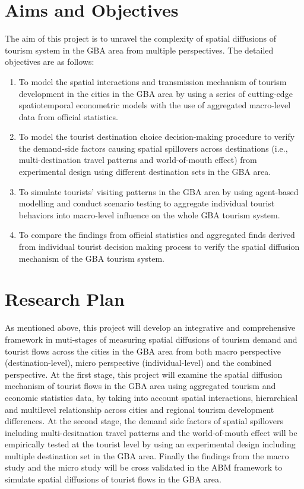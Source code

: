 \documentclass[11pt,a4paper]{amsart}
\theoremstyle{plain}
\theoremstyle{definition}
\begin{document}
\section{Aims and Objectives}
The aim of this project is to unravel the complexity of spatial diffusions of tourism system in the GBA area from multiple perspectives. The detailed objectives are as follows:
\begin{enumerate}
	\item To model the spatial interactions and transmission mechanism of tourism development in the cities in the GBA area by using a series of cutting-edge spatiotemporal econometric models with the use of aggregated macro-level data from official statistics.
	\item To model the tourist destination choice decision-making procedure to verify the demand-side factors causing spatial spillovers across destinations (i.e., multi-destination travel patterns and world-of-mouth effect) from experimental design using different destination sets in the GBA area. 
	\item To simulate tourists’ visiting patterns in the GBA area by using agent-based modelling and conduct scenario testing to aggregate individual tourist behaviors into macro-level influence on the whole GBA tourism system.
	\item To compare the findings from official statistics and aggregated finds derived from individual tourist decision making process to verify the spatial diffusion mechanism of the GBA tourism system.
\end{enumerate}

\section{Research Plan}\hfill\par 
\noindent As mentioned above, this project will develop an integrative and comprehensive framework in muti-stages of measuring spatial diffusions of tourism demand and tourist flows across the cities in the GBA area from both macro perspective (destination-level), micro perspective (individual-level) and the combined perspective. At the first stage, this project will examine the spatial diffusion mechanism of tourist flows in the GBA area using aggregated tourism and economic statistics data, by taking into account spatial interactions, hierarchical and multilevel relationship across cities and regional tourism development differences. At the second stage, the demand side factors of spatial spillovers including multi-desitnation travel patterns and the world-of-mouth effect will be empirically tested at the tourist level by using an experimental design including multiple destination set in the GBA area. Finally the findings from the macro study and the micro study will be cross validated in the ABM framework to simulate spatial diffusions of tourist flows in the GBA area.
\end{document}
